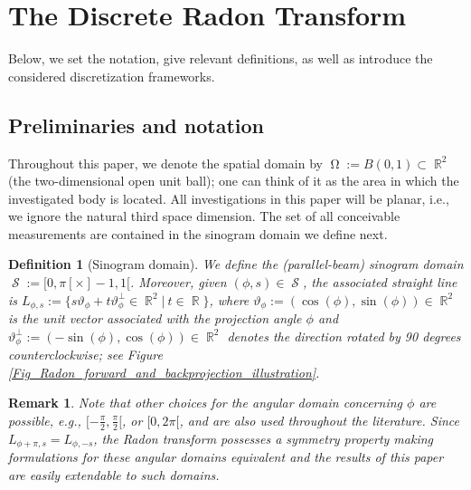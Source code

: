 \documentclass[11pt,reqno]{amsart}
\DeclareMathOperator{\RR}{\mathbb{R}}
\DeclareMathOperator{\imgdom}{\Omega}
\DeclareMathOperator{\sinodom}{\mathcal{S}}
\numberwithin{theorem}{section}
\newtheorem{definition}[theorem]{Definition}
\newtheorem{remark}[theorem]{Remark}
\theoremstyle{remark}
\begin{document}
\section{The Discrete Radon Transform}
\label{section_Radon}
Below, we set the notation, give relevant definitions, as well as introduce the considered discretization frameworks.
\subsection{Preliminaries and notation}
\label{section_Radon_notation}

Throughout this paper, we denote the spatial domain by ${\imgdom:=B(0,1)}\subset \RR^2$ (the two-dimensional open unit ball); one can think of it as the area in which the investigated body is located. All investigations in this paper will be planar, i.e., we ignore the natural third space dimension. The set of all conceivable measurements are contained in the sinogram domain we define next.

\begin{definition}[Sinogram domain]
We define the (parallel-beam) sinogram domain $\sinodom:=[0,\pi[\times ]-1,1[$. Moreover, given $(\phi,s)\in \sinodom$, the associated straight line is $L_{\phi,s}:=\{s \vartheta_\phi+t\vartheta_\phi^\perp \in \RR^2\big | \ t\in \RR\}$, where $\vartheta_\phi:=(\cos(\phi),\sin(\phi))\in \RR^2$ is the unit vector  associated with the projection angle $\phi$ and $\vartheta_\phi^\perp:=(-\sin(\phi),\cos(\phi))\in \RR^2$ denotes the direction rotated by 90 degrees counterclockwise; see Figure \ref{Fig_Radon_forward_and_backprojection_illustration}.
\end{definition}

\begin{remark} \label{remark_angular_domain}
Note that other choices for the angular domain concerning $\phi$ are possible, e.g., $[-\frac{\pi}{2},\frac{\pi}{2}[$, or $[0,2\pi[$, and are also used throughout the literature. Since $L_{\phi+\pi,s}=L_{\phi,-s}$, the Radon transform possesses a symmetry property making formulations for these angular domains equivalent and the results of this paper are easily extendable to such domains.
\end{remark}
\end{document}
